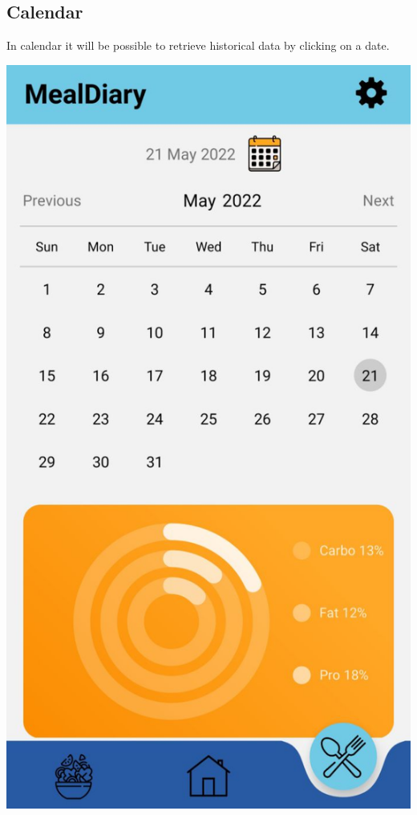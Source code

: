 \documentclass[12pt,hidelinks]{article}
\begin{document}
	\subsection{Calendar}
	In calendar it will be possible to retrieve historical data by clicking on a date. 
	\begin{center}

	\includegraphics[scale=0.2]{screenshot4}
\end{center}
\end{document}
